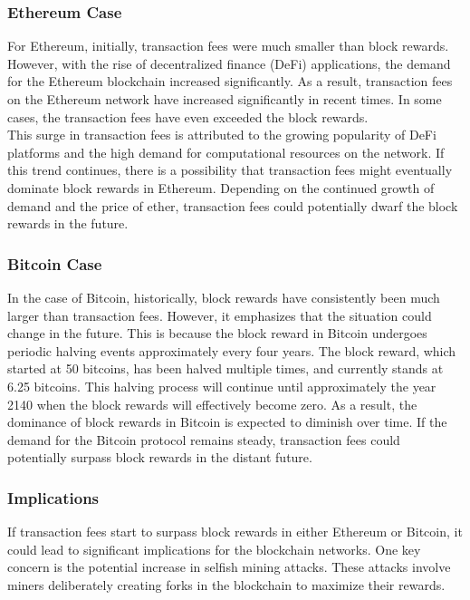 \subsubsection{Ethereum Case}
For Ethereum, initially, transaction fees were much smaller than block rewards. However, with the rise of decentralized finance (DeFi) applications, the demand for the Ethereum blockchain increased significantly. As a result, transaction fees on the Ethereum network have increased significantly in recent times. In some cases, the transaction fees have even exceeded the block rewards.\\
This surge in transaction fees is attributed to the growing popularity of DeFi platforms and the high demand for computational resources on the network. If this trend continues, there is a possibility that transaction fees might eventually dominate block rewards in Ethereum. Depending on the continued growth of demand and the price of ether, transaction fees could potentially dwarf the block rewards in the future.

\subsubsection{Bitcoin Case}
In the case of Bitcoin, historically, block rewards have consistently been much larger than transaction fees. However, it emphasizes that the situation could change in the future. This is because the block reward in Bitcoin undergoes periodic halving events approximately every four years. The block reward, which started at 50 bitcoins, has been halved multiple times, and currently stands at 6.25 bitcoins. This halving process will continue until approximately the year 2140 when the block rewards will effectively become zero. As a result, the dominance of block rewards in Bitcoin is expected to diminish over time. If the demand for the Bitcoin protocol remains steady, transaction fees could potentially surpass block rewards in the distant future.

\subsubsection{Implications}
If transaction fees start to surpass block rewards in either Ethereum or Bitcoin, it could lead to significant implications for the blockchain networks. One key concern is the potential increase in selfish mining attacks. These attacks involve miners deliberately creating forks in the blockchain to maximize their rewards.\\

